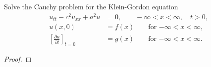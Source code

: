 \begin{problem}{2.10}
  Solve the Cauchy problem for the Klein-Gordon equation
  \begin{align*}
    u_{tt} - c^2 u_{xx} + a^2 u &= 0, \qquad -\infty < x < \infty, \quad t > 0, \\
    u(x, 0) &= f(x) \qquad \text{for $-\infty < x < \infty,$} \\
    \left[\frac{\partial u}{\partial t}\right]_{t=0} &= g(x) \qquad \text{for $-\infty < x < \infty$}.
  \end{align*}
\end{problem}

\begin{proof}
\end{proof}
\newpage
